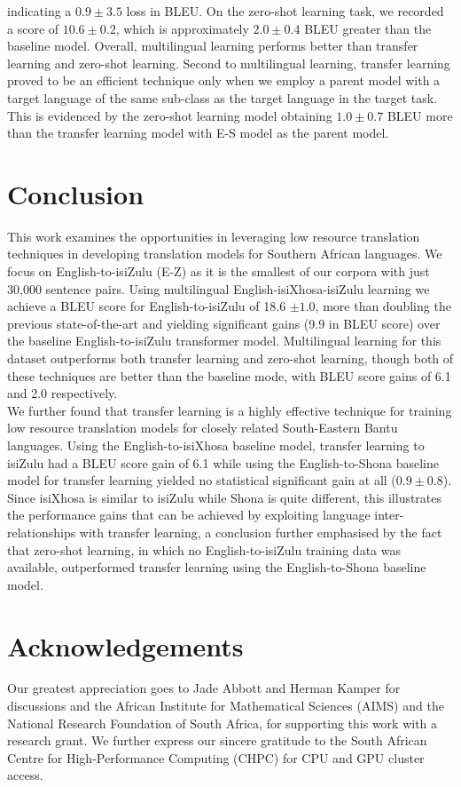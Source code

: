 \documentclass[11pt,a4paper]{article}
\begin{document}
indicating a $0.9 \pm 3.5$ loss in BLEU. On the zero-shot learning task, we recorded a score of $10.6 \pm 0.2$, which is approximately $2.0 \pm 0.4$ BLEU greater than the baseline model. Overall, multilingual learning performs better than transfer learning and zero-shot learning. Second to multilingual learning, transfer learning proved to be an efficient technique only when we employ a parent model with a target language of the same sub-class as the target language in the target task. This is evidenced by the zero-shot learning model obtaining $1.0 \pm 0.7$ BLEU more than the transfer learning model with E-S model as the parent model.   

\section{Conclusion}\label{sec: conclusions}
This work examines the opportunities in leveraging low resource translation techniques in developing translation models for Southern African languages. We focus on English-to-isiZulu (E-Z) as it is the smallest of our corpora with just 30,000 sentence pairs. Using multilingual English-isiXhosa-isiZulu learning we achieve a BLEU score for English-to-isiZulu  of 18.6 $\pm 1.0$, more than doubling the previous  state-of-the-art and yielding significant gains (9.9 in BLEU score) over the baseline English-to-isiZulu transformer model.  Multilingual learning for this dataset outperforms both transfer learning and zero-shot learning, though both of these techniques are better than the baseline mode, with BLEU score gains of 6.1 and 2.0 respectively. \\ \indent We further found that transfer learning is a highly effective technique for training low resource translation models for closely related South-Eastern Bantu languages. Using the English-to-isiXhosa baseline model, transfer learning to isiZulu had a BLEU score gain of 6.1 while using the English-to-Shona baseline model for transfer learning yielded no statistical significant gain at all ($0.9 \pm 0.8$). Since isiXhosa is similar to isiZulu while Shona is quite different, this illustrates the performance gains that can be achieved by exploiting language inter-relationships with transfer learning, a conclusion further emphasised by the fact that zero-shot learning, in which no English-to-isiZulu training data was available, outperformed transfer learning using the English-to-Shona baseline model.  


\section{Acknowledgements}
Our greatest appreciation goes to Jade Abbott and Herman Kamper for discussions and the African Institute for Mathematical Sciences (AIMS) and the National Research Foundation of South Africa, for supporting this work with a research grant. We further express our sincere gratitude to the South African Centre for High-Performance Computing (CHPC) for CPU and GPU cluster access.






\appendix
\end{document}
